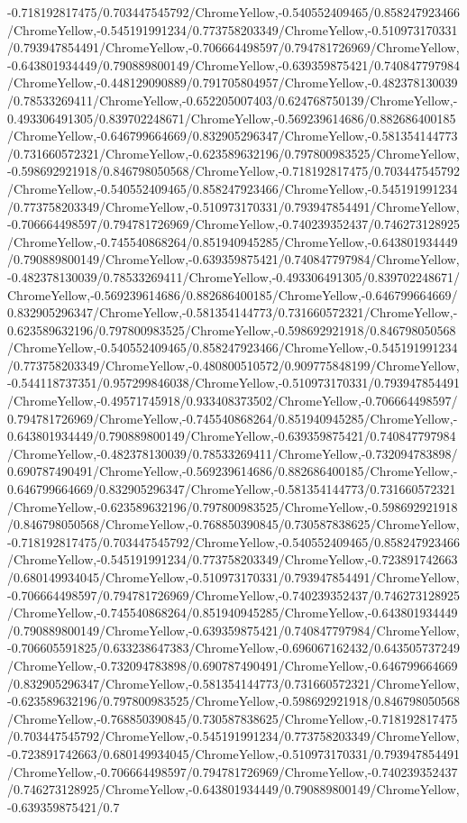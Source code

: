{\begin{tikzternal}
{-0.718192817475/0.703447545792/ChromeYellow,-0.540552409465/0.858247923466/ChromeYellow,-0.545191991234/0.773758203349/ChromeYellow,-0.510973170331/0.793947854491/ChromeYellow,-0.706664498597/0.794781726969/ChromeYellow,-0.643801934449/0.790889800149/ChromeYellow,-0.639359875421/0.740847797984/ChromeYellow,-0.448129090889/0.791705804957/ChromeYellow,-0.482378130039/0.78533269411/ChromeYellow,-0.652205007403/0.624768750139/ChromeYellow,-0.493306491305/0.839702248671/ChromeYellow,-0.569239614686/0.882686400185/ChromeYellow,-0.646799664669/0.832905296347/ChromeYellow,-0.581354144773/0.731660572321/ChromeYellow,-0.623589632196/0.797800983525/ChromeYellow,-0.598692921918/0.846798050568/ChromeYellow,-0.718192817475/0.703447545792/ChromeYellow,-0.540552409465/0.858247923466/ChromeYellow,-0.545191991234/0.773758203349/ChromeYellow,-0.510973170331/0.793947854491/ChromeYellow,-0.706664498597/0.794781726969/ChromeYellow,-0.740239352437/0.746273128925/ChromeYellow,-0.745540868264/0.851940945285/ChromeYellow,-0.643801934449/0.790889800149/ChromeYellow,-0.639359875421/0.740847797984/ChromeYellow,-0.482378130039/0.78533269411/ChromeYellow,-0.493306491305/0.839702248671/ChromeYellow,-0.569239614686/0.882686400185/ChromeYellow,-0.646799664669/0.832905296347/ChromeYellow,-0.581354144773/0.731660572321/ChromeYellow,-0.623589632196/0.797800983525/ChromeYellow,-0.598692921918/0.846798050568/ChromeYellow,-0.540552409465/0.858247923466/ChromeYellow,-0.545191991234/0.773758203349/ChromeYellow,-0.480800510572/0.909775848199/ChromeYellow,-0.544118737351/0.957299846038/ChromeYellow,-0.510973170331/0.793947854491/ChromeYellow,-0.49571745918/0.933408373502/ChromeYellow,-0.706664498597/0.794781726969/ChromeYellow,-0.745540868264/0.851940945285/ChromeYellow,-0.643801934449/0.790889800149/ChromeYellow,-0.639359875421/0.740847797984/ChromeYellow,-0.482378130039/0.78533269411/ChromeYellow,-0.732094783898/0.690787490491/ChromeYellow,-0.569239614686/0.882686400185/ChromeYellow,-0.646799664669/0.832905296347/ChromeYellow,-0.581354144773/0.731660572321/ChromeYellow,-0.623589632196/0.797800983525/ChromeYellow,-0.598692921918/0.846798050568/ChromeYellow,-0.768850390845/0.730587838625/ChromeYellow,-0.718192817475/0.703447545792/ChromeYellow,-0.540552409465/0.858247923466/ChromeYellow,-0.545191991234/0.773758203349/ChromeYellow,-0.723891742663/0.680149934045/ChromeYellow,-0.510973170331/0.793947854491/ChromeYellow,-0.706664498597/0.794781726969/ChromeYellow,-0.740239352437/0.746273128925/ChromeYellow,-0.745540868264/0.851940945285/ChromeYellow,-0.643801934449/0.790889800149/ChromeYellow,-0.639359875421/0.740847797984/ChromeYellow,-0.706605591825/0.633238647383/ChromeYellow,-0.696067162432/0.643505737249/ChromeYellow,-0.732094783898/0.690787490491/ChromeYellow,-0.646799664669/0.832905296347/ChromeYellow,-0.581354144773/0.731660572321/ChromeYellow,-0.623589632196/0.797800983525/ChromeYellow,-0.598692921918/0.846798050568/ChromeYellow,-0.768850390845/0.730587838625/ChromeYellow,-0.718192817475/0.703447545792/ChromeYellow,-0.545191991234/0.773758203349/ChromeYellow,-0.723891742663/0.680149934045/ChromeYellow,-0.510973170331/0.793947854491/ChromeYellow,-0.706664498597/0.794781726969/ChromeYellow,-0.740239352437/0.746273128925/ChromeYellow,-0.643801934449/0.790889800149/ChromeYellow,-0.639359875421/0.7}
\end{tikzternal}}

